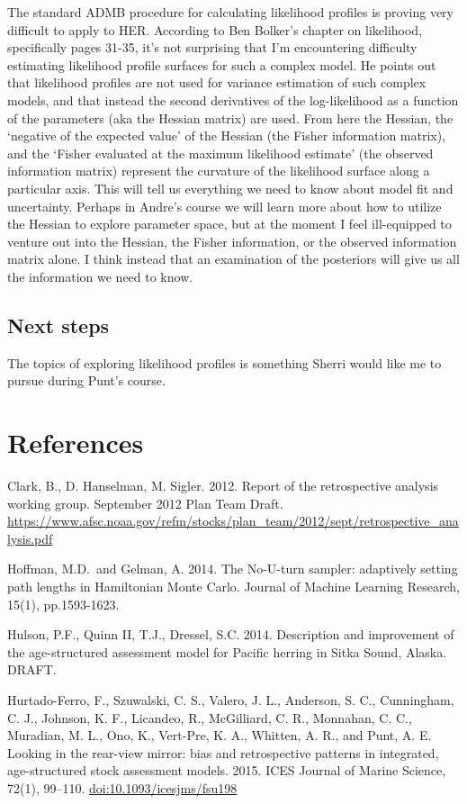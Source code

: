 \documentclass[]{article}
\begin{document}
The standard ADMB procedure for calculating likelihood profiles is
proving very difficult to apply to HER. According to Ben Bolker's
chapter on likelihood, specifically pages 31-35, it's not surprising
that I'm encountering difficulty estimating likelihood profile surfaces
for such a complex model. He points out that likelihood profiles are not
used for variance estimation of such complex models, and that instead
the second derivatives of the log-likelihood as a function of the
parameters (aka the Hessian matrix) are used. From here the Hessian, the
`negative of the expected value' of the Hessian (the Fisher information
matrix), and the `Fisher evaluated at the maximum likelihood estimate'
(the observed information matrix) represent the curvature of the
likelihood surface along a particular axis. This will tell us everything
we need to know about model fit and uncertainty. Perhaps in Andre's
course we will learn more about how to utilize the Hessian to explore
parameter space, but at the moment I feel ill-equipped to venture out
into the Hessian, the Fisher information, or the observed information
matrix alone. I think instead that an examination of the posteriors will
give us all the information we need to know.

\subsection{Next steps}\label{next-steps-5}

The topics of exploring likelihood profiles is something Sherri would
like me to pursue during Punt's course.

\section{References}\label{references}

Clark, B., D. Hanselman, M. Sigler. 2012. Report of the retrospective
analysis working group. September 2012 Plan Team Draft.
\url{https://www.afsc.noaa.gov/refm/stocks/plan_team/2012/sept/retrospective_analysis.pdf}

Hoffman, M.D.~and Gelman, A. 2014. The No-U-turn sampler: adaptively
setting path lengths in Hamiltonian Monte Carlo. Journal of Machine
Learning Research, 15(1), pp.1593-1623.

Hulson, P.F., Quinn II, T.J., Dressel, S.C. 2014. Description and
improvement of the age-structured assessment model for Pacific herring
in Sitka Sound, Alaska. DRAFT.

Hurtado-Ferro, F., Szuwalski, C. S., Valero, J. L., Anderson, S. C.,
Cunningham, C. J., Johnson, K. F., Licandeo, R., McGilliard, C. R.,
Monnahan, C. C., Muradian, M. L., Ono, K., Vert-Pre, K. A., Whitten, A.
R., and Punt, A. E. Looking in the rear-view mirror: bias and
retrospective patterns in integrated, age-structured stock assessment
models. 2015. ICES Journal of Marine Science, 72(1), 99--110.
\url{doi:10.1093/icesjms/fsu198}
\end{document}
